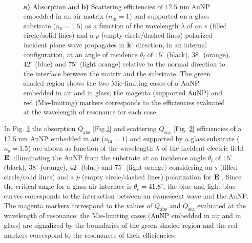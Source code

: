 \begin{figure}[b!]
    \def\svgwidth{.95\textwidth}
    \centering
    \hspace*{-28.5em}%
    \vspace*{-1.25em}%
        \begin{subfigure}{.655\textwidth}\caption{ }\label{sfig:SuppObl:Eff:Abs}\end{subfigure}%
        \begin{subfigure}{.25\textwidth}\caption{ }\label{sfig:SuppObl:Eff:Sca}\end{subfigure} \\
    \vspace*{-.75em}
    \caption[Absorption and Scattering Efficiencies of a 12.5 nm AuNP on a Interface Illuminated in an internal configuration at oblique incidence]{\textbf{a)} Absorption and \textbf{b)} Scattering efficiencies of $12.5$ nm AuNP embedded in an air matrix ($n_\text{m} = 1$) and supported on a glass substrate ($n_\text{s} = 1.5$) as a function of the wavelength $\lambda$ of an  $s$ (filled circle/solid lines) and a $p$ (empty circle/dashed lines) polarized incident plane wave propagates in $\vb{k}^\text{i}$ direction, in an internal configuration, at an angle of incidence $\theta_i$ of $15^\circ$ (black),  $38^\circ$ (orange),  $42^\circ$ (blue) and  $75^\circ$ (light orange) relative to the normal direction to the interface between the matrix and the substrate. The green shaded region shows the two Mie-limiting cases of a AuNP embedded in air and in glass; the magenta (supported AuNP) and red (Mie-limiting) markers corresponds to the efficiencies evaluated at the wavelength of resonance for each case.}
\label{fig:SuppObl:Eff}
\end{figure}

In Fig. \ref{fig:SuppObl:Eff} the absorption $Q_\text{abs}$ [Fig.\ref{sfig:SuppObl:Eff:Abs}] and scattering $Q_\text{sca}$ [Fig. \ref{sfig:SuppObl:Eff:Sca}] efficiencies of a 12.5 nm AuNP embedded in air ($n_\text{m} = 1$) and supported by a glass substrate ($n_\text{s} = 1.5$) are shown as function of the wavelength $\lambda$ of the incident electric field $\vb{E}^\text{i}$ illuminating the AuNP from the substrate at an incidence angle $\theta_i$ of $15^\circ$ (black),  $38^\circ$ (orange),   $42^\circ$ (blue) and  $75^\circ$ (light orange) considering an $s$ (filled circle/solid lines) and a $p$ (empty circle/dashed lines) polarization for $\vb{E}^\text{i}$. Since the critical angle for a glass-air interface is $\theta_c = 41.8^\circ$, the blue and light blue curves corresponds to the interaction between an evanescent wave and the AuNP. The magenta markers correspond to the values of $Q_\text{abs}$ and $Q_\text{sca}$ evaluated at the wavelength of resonance; the Mie-limiting cases (AuNP embedded in air and in glass)  are signalized by the boundaries of the green shaded region  and the red markers correspond to the resonances of their efficiencies.

